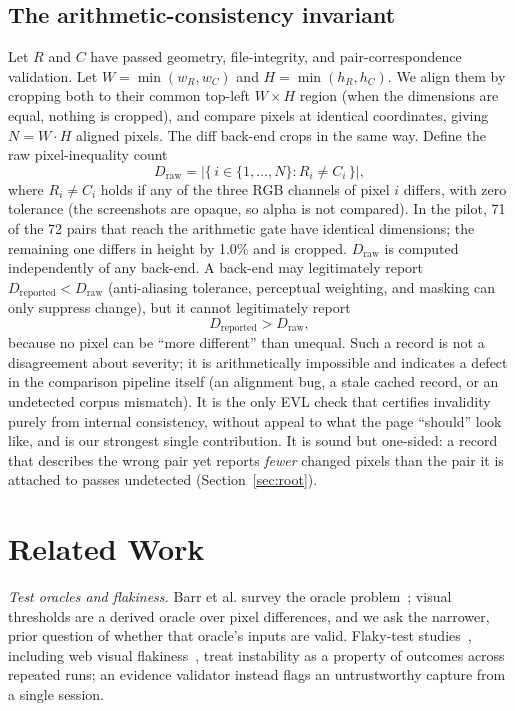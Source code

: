 \documentclass[conference]{IEEEtran}
\newcommand{\Dr}{D_{\mathrm{reported}}}
\newcommand{\Dw}{D_{\mathrm{raw}}}
\begin{document}
\subsection{The arithmetic-consistency invariant}
Let $R$ and $C$ have passed geometry, file-integrity, and pair-correspondence validation. Let $W=\min(w_R,w_C)$ and $H=\min(h_R,h_C)$. We align them by cropping both to their common top-left $W\times H$ region (when the dimensions are equal, nothing is cropped), and compare pixels at identical coordinates, giving $N=W\!\cdot\!H$ aligned pixels. The diff back-end crops in the same way. Define the raw pixel-inequality count
\begin{equation}
\Dw = \bigl|\{\, i \in \{1,\dots,N\} : R_i \neq C_i \,\}\bigr|,
\end{equation}
where $R_i \neq C_i$ holds if any of the three RGB channels of pixel $i$ differs, with zero tolerance (the screenshots are opaque, so alpha is not compared). In the pilot, 71 of the 72 pairs that reach the arithmetic gate have identical dimensions; the remaining one differs in height by 1.0\% and is cropped. $\Dw$ is computed independently of any back-end. A back-end may legitimately report $\Dr < \Dw$ (anti-aliasing tolerance, perceptual weighting, and masking can only suppress change), but it cannot legitimately report
\begin{equation}
\Dr > \Dw,
\end{equation}
because no pixel can be ``more different'' than unequal. Such a record is not a disagreement about severity; it is arithmetically impossible and indicates a defect in the comparison pipeline itself (an alignment bug, a stale cached record, or an undetected corpus mismatch). It is the only EVL check that certifies invalidity purely from internal consistency, without appeal to what the page ``should'' look like, and is our strongest single contribution. It is sound but one-sided: a record that describes the wrong pair yet reports \emph{fewer} changed pixels than the pair it is attached to passes undetected (Section~\ref{sec:root}).

\section{Related Work}\label{sec:related}
\textit{Test oracles and flakiness.} Barr et al. survey the oracle problem~\cite{barr2015}; visual thresholds are a derived oracle over pixel differences, and we ask the narrower, prior question of whether that oracle's inputs are valid. Flaky-test studies~\cite{parry2022,romano2021}, including web visual flakiness~\cite{pei2026}, treat instability as a property of outcomes across repeated runs; an evidence validator instead flags an untrustworthy capture from a single session.
\end{document}
